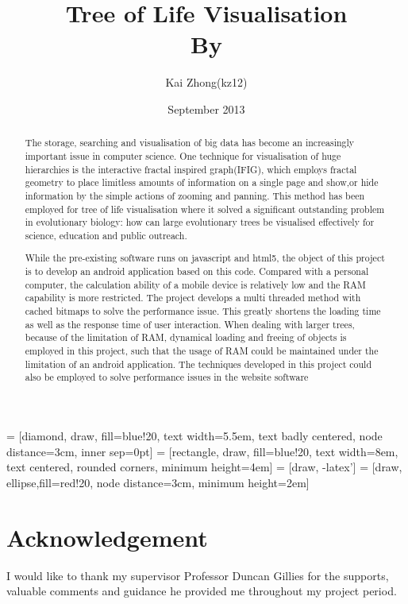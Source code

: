 \documentclass[MSc]{icldt}
\title{Tree of Life Visualisation \\ By}
\author{Kai Zhong(kz12)}
\date{September 2013}
\begin{document}
\maketitle

 = [diamond, draw, fill=blue!20, 
    text width=5.5em, text badly centered, node distance=3cm, inner sep=0pt]
 = [rectangle, draw, fill=blue!20, 
    text width=8em, text centered, rounded corners, minimum height=4em]
 = [draw, -latex']
 = [draw, ellipse,fill=red!20, node distance=3cm,
    minimum height=2em]
    
\begin{abstract}

The storage, searching and visualisation of big data has become an increasingly important issue in computer science. One technique for visualisation of huge hierarchies is the interactive fractal inspired graph(IFIG), which employs fractal geometry to place limitless amounts of information on a single page and show,or  hide information by the simple actions of zooming and panning. This method has been employed for tree of life visualisation where it solved a significant outstanding problem in evolutionary biology: how can large evolutionary trees be visualised effectively for science, education and public outreach.

While the pre-existing software runs on javascript and html5, the object of this project is to develop an android application based on this code. Compared with a personal computer, the calculation ability of a mobile device is relatively low and the RAM capability is more restricted. The project develops a multi threaded method with cached bitmaps to solve the performance issue. This greatly shortens the loading time as well as the response time of user interaction. When dealing with larger trees, because of the limitation of RAM, dynamical loading and freeing of objects is employed in this project, such that the usage of RAM could be maintained under the limitation of an android application. 
The techniques developed in this project could also be employed to solve performance issues in the website software

\end{abstract}

\chapter*{Acknowledgement}

I would like to thank my supervisor Professor Duncan Gillies for the supports, valuable comments and guidance he provided me throughout my project period.
\end{document}
